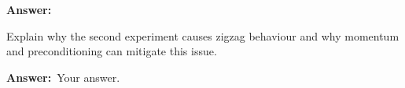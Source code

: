 \documentclass[addpoints]{exam}
\newcommand{\tbold}[1]{\textbf{#1}}
\newcommand{\answer}{\tbold{Answer:}\ }
\begin{document}
\begin{questions}
\begin{parts}
            \answer



            Explain why the second experiment causes zigzag behaviour and why momentum and preconditioning can
            mitigate this issue.

            \answer Your answer.
        \end{parts}

    \end{questions}
\end{document}
